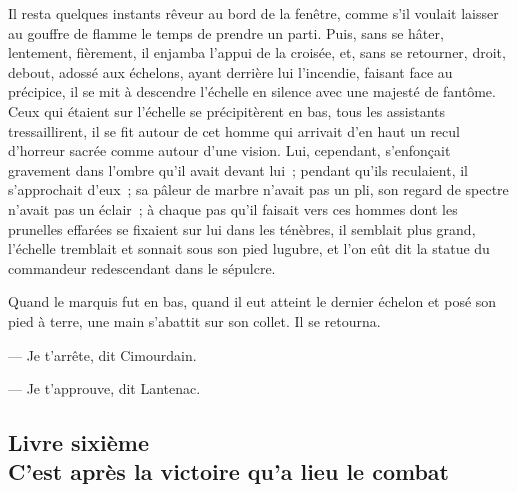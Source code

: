 \documentclass[french,twoside]{book} %
\begin{document}
Il resta quelques instants rêveur au bord de la fenêtre, comme s’il voulait laisser au gouffre de flamme le temps de prendre un parti. Puis, sans se hâter, lentement, fièrement, il enjamba l’appui de la croisée, et, sans se retourner, droit, debout, adossé aux échelons, ayant derrière lui l’incendie, faisant face au précipice, il se mit à descendre l’échelle en silence avec une majesté de fantôme. Ceux qui étaient sur l’échelle se précipitèrent en bas, tous les assistants tressaillirent, il se fit autour de cet homme qui arrivait d’en haut un recul d’horreur sacrée comme autour d’une vision. Lui, cependant, s’enfonçait gravement dans l’ombre qu’il avait devant lui ; pendant qu’ils reculaient, il s’approchait d’eux ; sa pâleur de marbre n’avait pas un pli, son regard de spectre n’avait pas un éclair ; à chaque pas qu’il faisait vers ces hommes dont les prunelles effarées se fixaient sur lui dans les ténèbres, il semblait plus grand, l’échelle tremblait et sonnait sous son pied lugubre, et l’on eût dit la statue du commandeur redescendant dans le sépulcre.\par
Quand le marquis fut en bas, quand il eut atteint le dernier échelon et posé son pied à terre, une main s’abattit sur son collet. Il se retourna.\par
— Je t’arrête, dit Cimourdain.\par
— Je t’approuve, dit Lantenac.\par
  \subsection[{Livre sixième. C’est après la victoire qu’a lieu le combat}]{Livre sixième \\
C’est après la victoire qu’a lieu le combat}
\label{p3l6}
\end{document}
